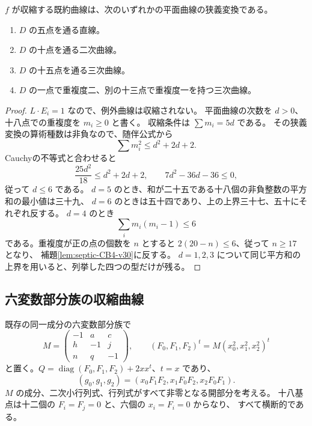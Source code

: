 \begin{lemma}[収縮候補の有限な型]
\label{lem:septic-contraction-types-v30}
$f$ が収縮する既約曲線は、次のいずれかの平面曲線の狭義変換である。
\begin{enumerate}
\item $D$ の五点を通る直線。
\item $D$ の十点を通る二次曲線。
\item $D$ の十五点を通る三次曲線。
\item $D$ の一点で重複度二、別の十三点で重複度一を持つ三次曲線。
\end{enumerate}
\end{lemma}
\begin{proof}
$L\cdot E_i=1$ なので、例外曲線は収縮されない。
平面曲線の次数を $d>0$、十八点での重複度を $m_i\ge0$ と書く。
収縮条件は $\sum m_i=5d$ である。
その狭義変換の算術種数は非負なので、随伴公式から
\[
 \sum m_i^2\le d^2+2d+2.
\]
Cauchyの不等式と合わせると
\[
 \frac{25d^2}{18}\le d^2+2d+2,
 \qquad 7d^2-36d-36\le0,
\]
従って $d\le6$ である。
$d=5$ のとき、和が二十五である十八個の非負整数の平方和の最小値は三十九、
$d=6$ のときは五十四であり、上の上界三十七、五十にそれぞれ反する。
$d=4$ のとき
\[
 \sum_i m_i(m_i-1)\le6
\]
である。重複度が正の点の個数を $n$ とすると
$2(20-n)\le6$、従って $n\ge17$ となり、
補題\ref{lem:septic-CB4-v30}に反する。
$d=1,2,3$ について同じ平方和の上界を用いると、列挙した四つの型だけが残る。
\end{proof}

\subsection{六変数部分族の収縮曲線}

既存の同一成分の六変数部分族で
\[
 M=\begin{pmatrix}-1&a&c\\h&-1&j\\n&q&-1\end{pmatrix},\qquad
 (F_0,F_1,F_2)^t=M(x_0^2,x_1^2,x_2^2)^t
\]
と置く。$Q=\operatorname{diag}(F_0,F_1,F_2)+2xx^t$、$t=x$ であり、
\[
 (g_0,g_1,g_2)=(x_0F_1F_2,x_1F_0F_2,x_2F_0F_1).
\]
$M$ の成分、二次小行列式、行列式がすべて非零となる開部分を考える。
十八基点は十二個の $F_i=F_j=0$ と、六個の $x_i=F_i=0$ からなり、
すべて横断的である。

